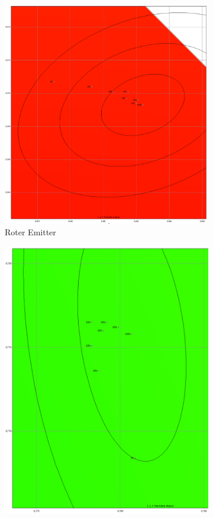 \documentclass[11pt]{scrartcl}
\begin{document}
\begin{figure}[H]
    \centering
    \begin{subfigure}[b]{.49\textwidth}
        \includegraphics[width=\textwidth]{images/macAdam/skypanelRed.png}
        \caption{Roter Emitter}
    \end{subfigure}
    \hfill 
    \begin{subfigure}[b]{.49\textwidth}
        \includegraphics[width=\textwidth]{images/macAdam/skypanelGreen.png}

\end{subfigure}
\end{figure}
\end{document}
